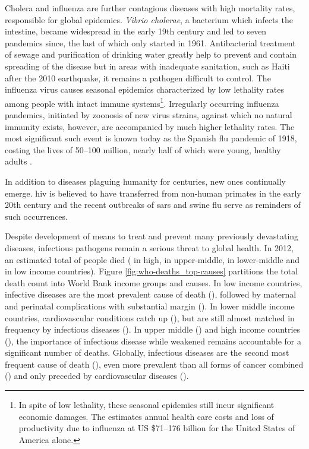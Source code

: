 Cholera and influenza are further contagious diseases with high mortality rates, responsible for global epidemics. \textit{Vibrio cholerae}, a bacterium which infects the intestine, became widespread in the early 19th century and led to seven pandemics since, the last of which only started in 1961. Antibacterial treatment of sewage and purification of drinking water greatly help to prevent and contain spreading of the disease but in areas with inadequate sanitation, such as Haiti after the 2010 earthquake, it remains a pathogen difficult to control. The influenza virus causes seasonal epidemics characterized by low lethality rates among people with intact immune systems\footnote{In spite of low lethality, these seasonal epidemics still incur significant economic damages. The \cite{WHO2003} estimates annual health care costs and loss of productivity due to influenza at US \$71--176 billion for the United States of America alone.}. Irregularly occurring influenza pandemics, initiated by zoonosis of new virus strains, against which no natural immunity exists, however, are accompanied by much higher lethality rates. The most significant such event is known today as the Spanish flu pandemic of 1918, costing the lives of 50--100 million, nearly half of which were young, healthy adults \citep{Taubenberger2006}.

In addition to diseases plaguing humanity for centuries, new ones continually emerge. \Gls{hiv} is believed to have transferred from non-human primates in the early 20th century and the recent outbreaks of \gls{sars} and swine flu serve as reminders of such occurrences.




Despite development of means to treat and prevent many previously devastating diseases, infectious pathogens remain a serious threat to global health. In 2012, an estimated total of \knitrTotalDeathsTwelve{} people died (\knitrPercentageDeathsTwelveHigh{} in high, \knitrPercentageDeathsTwelveUmid{} in upper-middle, \knitrPercentageDeathsTwelveLmid{} in lower-middle and \knitrPercentageDeathsTwelveLow{} in low income countries). Figure \ref{fig:who-deaths_top-causes} partitions the total death count into World Bank income groups and causes. In low income countries, infective diseases are the most prevalent cause of death (\knitrPercentDeathsTwelveLowInfect{}), followed by maternal and perinatal complications with substantial margin (\knitrPercentDeathsTwelveLowPerinat{}). In lower middle income countries, cardiovascular conditions catch up (\knitrPercentDeathsTwelveLmidCardio{}), but are still almost matched in frequency by infectious diseases (\knitrPercentDeathsTwelveLmidInfect{}). In upper middle (\knitrPercentDeathsTwelveUmidInfect{}) and high income countries (\knitrPercentDeathsTwelveHighInfect{}), the importance of infectious disease while weakened remains accountable for a significant number of deaths. Globally, infectious diseases are the second most frequent cause of death (\knitrPercentDeathsTwelveWorldInfect{}), even more prevalent than all forms of cancer combined (\knitrPercentDeathsTwelveWorldCancer{}) and only preceded by cardiovascular diseases (\knitrPercentDeathsTwelveWorldCardio{}).

